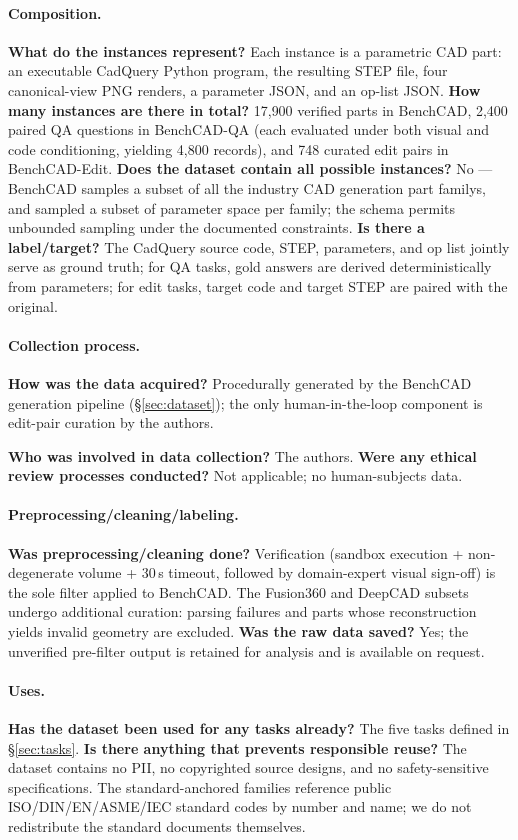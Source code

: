 \paragraph{Composition.}
\textbf{What do the instances represent?} Each instance is a parametric CAD part: an executable CadQuery Python program, the resulting STEP file, four canonical-view PNG renders, a parameter JSON, and an op-list JSON.
\textbf{How many instances are there in total?} 17{,}900 verified parts in BenchCAD, 2{,}400 paired QA questions in BenchCAD-QA (each evaluated under both visual and code conditioning, yielding 4{,}800 records), and 748 curated edit pairs in BenchCAD-Edit.
\textbf{Does the dataset contain all possible instances?} No --- BenchCAD samples a subset of all the industry CAD generation part familys, and sampled a subset of parameter space per family; the schema permits unbounded sampling under the documented constraints.
\textbf{Is there a label/target?} The CadQuery source code, STEP, parameters, and op list jointly serve as ground truth; for QA tasks, gold answers are derived deterministically from parameters; for edit tasks, target code and target STEP are paired with the original.

\paragraph{Collection process.}
\textbf{How was the data acquired?} Procedurally generated by the BenchCAD generation pipeline (\S\ref{sec:dataset}); the only human-in-the-loop component is edit-pair curation by the authors.


\textbf{Who was involved in data collection?} The authors.
\textbf{Were any ethical review processes conducted?} Not applicable; no human-subjects data.

\paragraph{Preprocessing/cleaning/labeling.}
\textbf{Was preprocessing/cleaning done?} Verification (sandbox execution + non-degenerate volume + 30\,s timeout, followed by domain-expert visual sign-off) is the sole filter applied to BenchCAD.
The Fusion360 and DeepCAD subsets undergo additional curation: parsing failures and parts whose reconstruction yields invalid geometry are excluded.
\textbf{Was the raw data saved?} Yes; the unverified pre-filter output is retained for analysis and is available on request.

\paragraph{Uses.}
\textbf{Has the dataset been used for any tasks already?} The five tasks defined in \S\ref{sec:tasks}.
\textbf{Is there anything that prevents responsible reuse?} The dataset contains no PII, no copyrighted source designs, and no safety-sensitive specifications.
The standard-anchored families reference public ISO/DIN/EN/ASME/IEC standard codes by number and name; we do not redistribute the standard documents themselves.

